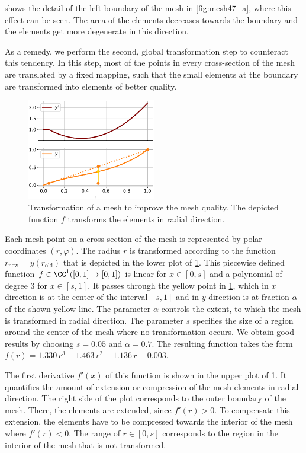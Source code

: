  shows the detail of the left boundary of the mesh in \cref{fig:mesh47_a}, where this effect can be seen. The area of the elements decreases towards the boundary and the elements get more degenerate in this direction.

As a remedy, we perform the second, global transformation step to counteract this tendency. In this step, most of the points in every cross-section of the mesh are translated by a fixed mapping, such that the small elements at the boundary are transformed into elements of better quality.

\begin{figure}
  \centering%
  \includegraphics[width=0.5\textwidth]{images/parallel_fiber_estimation/extend_mesh_plot.pdf}%
  \caption{Transformation of a mesh to improve the mesh quality. The depicted function $f$ transforms the elements in radial direction.}%
  \label{fig:extend_mesh_plot}%
\end{figure}%

Each mesh point on a cross-section of the mesh is represented by polar coordinates $(r,\varphi)$. The radius $r$ is transformed according to the function $r_\text{new} = y(r_\text{old})$ that is depicted in the lower plot of \cref{fig:extend_mesh_plot}. This piecewise defined function $f\in \CC^1([0,1]\to [0,1])$ is linear for $x\in [0,s]$ and a polynomial of degree 3 for $x \in [s,1]$. It passes through the yellow point in \cref{fig:extend_mesh_plot}, which in $x$ direction is at the center of the interval $[s,1]$ and in $y$ direction is at fraction $\alpha$ of the shown yellow line.
The parameter $\alpha$ controls the extent, to which the mesh is transformed in radial direction. The parameter $s$ specifies the size of a region around the center of the mesh where no transformation occurs. We obtain good results by choosing $s=0.05$ and $\alpha=0.7$. The resulting function takes the form $f(r) = 1.330\,r^3 - 1.463\,r^2 + 1.136\,r - 0.003$.

The first derivative $f'(x)$ of this function is shown in the upper plot of \cref{fig:extend_mesh_plot}. It quantifies the amount of extension or compression of the mesh elements in radial direction. The right side of the plot corresponds to the outer boundary of the mesh. There, the elements are extended, since $f'(r) > 0$. To compensate this extension, the elements have to be compressed towards the interior of the mesh  where $f'(r) < 0$. The range of $r \in [0,s]$ corresponds to the region in the interior of the mesh that is not transformed.


